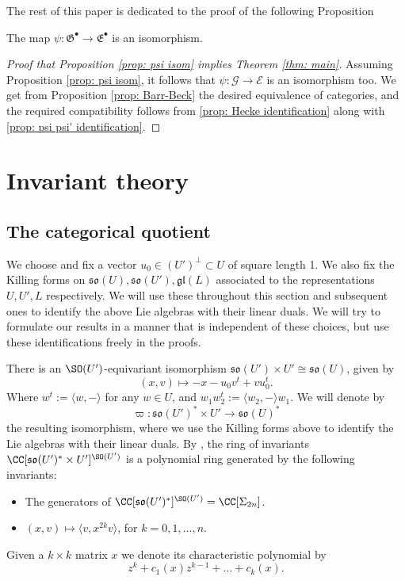 \documentclass[11pt]{article}
\begin{document}
The rest of this paper is dedicated to the proof of the following Proposition
\begin{proposition}\label{prop: psi isom}
    The map $\psi:\mathfrak{G}^\bullet\to \mathfrak{E}^\bullet$ is an isomorphism.
\end{proposition}
\begin{proof}[Proof that Proposition \ref{prop: psi isom} implies Theorem \ref{thm: main}]
    Assuming Proposition \ref{prop: psi isom}, it follows that $\psi:\mathscr{G}\to \mathscr{E}$ is an isomorphism too. We get from Proposition \ref{prop: Barr-Beck} the desired equivalence of categories, and the required compatibility follows from \ref{prop: Hecke identification} along with \ref{prop: psi psi' identification}.
\end{proof}

\section{Invariant theory}\label{sec: invariant theory}
\subsection{The categorical quotient}\label{sec: Categorical Quotient}
We choose and fix a vector $u_0\in(U')^\perp\subset U$ of square length 1.
We also fix the Killing forms on $\mathfrak{so}(U),\mathfrak{so}(U'), \mathfrak{gl}(L)$ associated to the representations $U,U', L$ respectively. We will use these throughout this section and subsequent ones to identify the above Lie algebras with their linear duals. We will try to formulate our results in a manner that is independent of these choices, but use these identifications freely in the proofs.

There is an $\SO(U')$-equivariant isomorphism $\mathfrak{so}(U')\times U' \cong \mathfrak{so}(U)$, given by
$$(x, v) \mapsto -x-u_0v^t+vu_0^t.$$
Where $w^t:=\langle w, -\rangle$ for any $w\in U$, and $w_1w_2^t:=\langle w_2, -\rangle w_1$.
We will denote by $$\varpi: \mathfrak{so}(U')^*\times U'\to \mathfrak{so}(U)^*$$ the resulting isomorphism, where we use the Killing forms above to identify the Lie algebras with their linear duals.
By \cite[Table 3a, row 2]{Sch}, the ring of invariants $\CC[\mathfrak{so}(U')^*\times U']^{\SO(U')}$ is a polynomial ring generated by the following invariants:
\begin{itemize}
    \item The generators of $\CC[\mathfrak{so}(U')^*]^{\SO(U')}=\CC[\Sigma_{2n}]$.
    \item $(x,v)\mapsto\langle v, x^{2k} v\rangle$, for $k=0,1,\ldots, n$.
\end{itemize}
Given a $k\times k$ matrix $x$ we denote its characteristic polynomial by $$z^k + c_1(x) z^{k-1} + \ldots + c_k(x).$$
\end{document}
